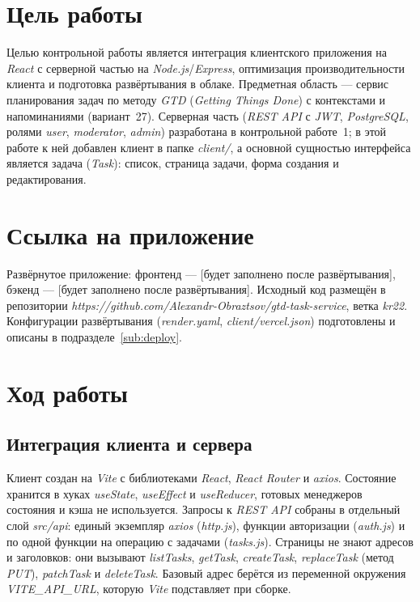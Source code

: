 \documentclass{stp}
\newcommand{\en}[1]{\textit{#1}}
\begin{document}

\section{Цель работы}

Целью контрольной работы является интеграция клиентского приложения на
\en{React} с серверной частью на \en{Node.js}/\en{Express}, оптимизация
производительности клиента и подготовка развёртывания в облаке. Предметная
область --- сервис планирования задач по методу \en{GTD} (\en{Getting Things
Done}) с контекстами и напоминаниями (вариант~27). Серверная часть
(\en{REST API} с \en{JWT}, \en{PostgreSQL}, ролями \en{user}, \en{moderator},
\en{admin}) разработана в контрольной работе~1; в этой работе к ней добавлен
клиент в папке \en{client/}, а основной сущностью интерфейса является задача
(\en{Task}): список, страница задачи, форма создания и редактирования.

\section{Ссылка на приложение}

Развёрнутое приложение: фронтенд --- [будет заполнено после развёртывания],
бэкенд --- [будет заполнено после развёртывания]. Исходный код размещён в
репозитории
\en{https://github.com/\allowbreak{}Alexandr-Obraztsov/\allowbreak{}gtd-task-service},
ветка \en{kr22}. Конфигурации развёртывания (\en{render.yaml},
\en{client/vercel.json}) подготовлены и описаны в
подразделе~\ref{sub:deploy}.

\section{Ход работы}

\subsection{Интеграция клиента и сервера}

Клиент создан на \en{Vite} с библиотеками \en{React}, \en{React Router} и
\en{axios}. Состояние хранится в хуках \en{useState}, \en{useEffect} и
\en{useReducer}, готовых менеджеров состояния и кэша не используется. Запросы
к \en{REST API} собраны в отдельный слой \en{src/api}: единый экземпляр
\en{axios} (\en{http.js}), функции авторизации (\en{auth.js}) и по одной
функции на операцию с задачами (\en{tasks.js}). Страницы не знают адресов и
заголовков: они вызывают \en{listTasks}, \en{getTask}, \en{createTask},
\en{replaceTask} (метод \en{PUT}), \en{patchTask} и \en{deleteTask}.
Базовый адрес берётся из переменной окружения \en{VITE\_API\_URL}, которую
\en{Vite} подставляет при сборке.
\end{document}
